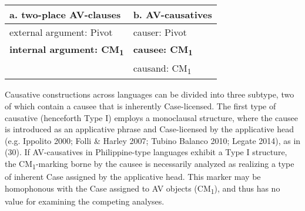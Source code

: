 \documentclass[10pt]{article}
\begin{document}
\vspace{-1mm}
\begin{exe}
\vspace{-1.5mm}
\begin{table}[h]
\hspace{+1.2cm}\begin{tabular}{ll}
     a. two-place AV-clauses     & b. AV-causatives\\ \midrule
   external argument: \hspace{+2mm}Pivot & causer: \hspace{+2mm}Pivot\\
   \textbf{internal argument: \hspace{+1mm}CM\textsubscript{1}} & \textbf{causee: \hspace{+1.5mm}CM\textsubscript{1}}\\
   & causand: CM\textsubscript{1}\\
              \midrule
              
\end{tabular}
\end{table}
\end{exe}

\vspace{-3mm}

Causative constructions across languages can be divided into three subtype, two of which contain a causee that is inherently Case-licensed. The first type of causative (henceforth Type I) employs a monoclausal structure, where the causee is introduced as an applicative phrase and Case-licensed by the applicative head (e.g. Ippolito 2000; Folli \& Harley 2007; Tubino Balanco 2010; Legate 2014), as in (30). If AV-causatives in Philippine-type languages exhibit a Type I structure, the CM\textsubscript{1}-marking borne by the causee is necessarily analyzed as realizing a type of inherent Case assigned by the applicative head. This marker may be homophonous with the Case assigned to AV objects (CM\textsubscript{1}), and thus has no value for examining the competing analyses.

\begin{exe}
 \\
 \end{exe}
\end{document}
